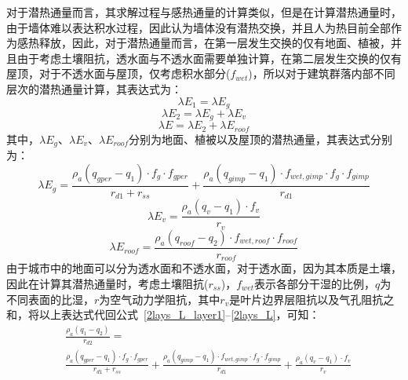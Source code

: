 对于潜热通量而言，其求解过程与感热通量的计算类似，但是在计算潜热通量时，由于墙体难以表达积水过程，因此认为墙体没有潜热交换，并且人为热目前全部作为感热释放，因此，对于潜热通量而言，在第一层发生交换的仅有地面、植被，并且由于考虑土壤阻抗，透水面与不透水面需要单独计算，在第二层发生交换的仅有屋顶，对于不透水面与屋顶，仅考虑积水部分($f_{wet}$)，所以对于建筑群落内部不同层次的潜热通量计算，其表达式为：
\begin{equation}\label{2lays_L_layer1}
    \lambda E_{1} = \lambda E_{g}
\end{equation}
%
\begin{equation}
    \lambda E_{2} = \lambda E_{g} + \lambda E_{v}
\end{equation}
%
\begin{equation}\label{2lays_L}
    \lambda E = \lambda E_{2} + \lambda E_{roof}
\end{equation}
其中，$\lambda E_{g}$、$\lambda E_{v}$、$\lambda E_{roof}$分别为地面、植被以及屋顶的潜热通量，其表达式分别为：
\begin{equation}\label{urban_Eg}
    \lambda E_{g} = \frac{\rho _a \left( q_{gper}-q_{1} \right) \cdot f_{g} \cdot f_{gper}}{r_{d1}+r_{ss}} + \frac{\rho _a \left( q_{gimp}-q_{1} \right) \cdot f_{wet,gimp} \cdot f_{g} \cdot f_{gimp}}{r_{d1}}
\end{equation}
%
\begin{equation}
    \lambda E_{v} = \frac{\rho _a \left( q_{v}-q_{1}\right) \cdot f_v}{r_{v}}
\end{equation}
%
\begin{equation}\label{urban_Eroof}
    \lambda E_{roof} = \frac{\rho _a \left( q_{roof}-q_{2}\right) \cdot f_{wet,roof} \cdot f_{roof}}{r_{roof}}
\end{equation}
由于城市中的地面可以分为透水面和不透水面，对于透水面，因为其本质是土壤，因此在计算其潜热通量时，考虑土壤阻抗($r_{ss}$)，$f_{wet}$表示各部分干湿的比例，$q$为不同表面的比湿，$r$为空气动力学阻抗，其中$r_v$是叶片边界层阻抗以及气孔阻抗之和，将以上表达式代回公式~\eqref{2lays_L_layer1}--\eqref{2lays_L}，可知：
\begin{equation}
   \begin{split}
    & \frac{\rho _a \left( q_{1}-q_{2}\right)}{r_{d2}} = \\
    & \frac{\rho _a \left( q_{gper}-q_{1}\right) \cdot f_{g} \cdot f_{gper}}{r_{d1}+r_{ss}} + \frac{\rho _a \left( q_{gimp}-q_{1} \right) \cdot f_{wet,gimp} \cdot f_{g} \cdot f_{gimp}}{r_{d1}} + \frac{\rho _a \left( q_{v}-q_{1}\right) \cdot f_v}{r_{v}}
   \end{split} 
\end{equation}
